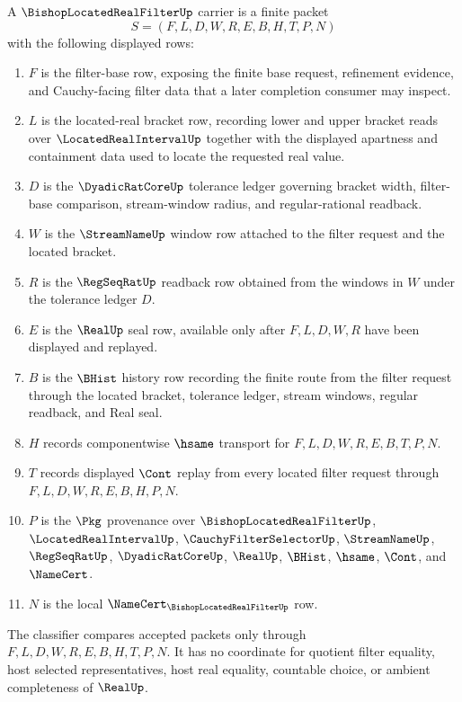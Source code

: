 \begin{definition}
\label{def:bishop-located-real-filter-carrier}
A $\BishopLocatedRealFilterUp$ carrier is a finite packet
$$
S=(F,L,D,W,R,E,B,H,T,P,N)
$$
with the following displayed rows:
\begin{enumerate}
\item $F$ is the filter-base row, exposing the finite base request, refinement evidence, and Cauchy-facing filter data that a later completion consumer may inspect.
\item $L$ is the located-real bracket row, recording lower and upper bracket reads over $\LocatedRealIntervalUp$ together with the displayed apartness and containment data used to locate the requested real value.
\item $D$ is the $\DyadicRatCoreUp$ tolerance ledger governing bracket width, filter-base comparison, stream-window radius, and regular-rational readback.
\item $W$ is the $\StreamNameUp$ window row attached to the filter request and the located bracket.
\item $R$ is the $\RegSeqRatUp$ readback row obtained from the windows in $W$ under the tolerance ledger $D$.
\item $E$ is the $\RealUp$ seal row, available only after $F,L,D,W,R$ have been displayed and replayed.
\item $B$ is the $\BHist$ history row recording the finite route from the filter request through the located bracket, tolerance ledger, stream windows, regular readback, and Real seal.
\item $H$ records componentwise $\hsame$ transport for $F,L,D,W,R,E,B,T,P,N$.
\item $T$ records displayed $\Cont$ replay from every located filter request through $F,L,D,W,R,E,B,H,P,N$.
\item $P$ is the $\Pkg$ provenance over $\BishopLocatedRealFilterUp$, $\LocatedRealIntervalUp$, $\CauchyFilterSelectorUp$, $\StreamNameUp$, $\RegSeqRatUp$, $\DyadicRatCoreUp$, $\RealUp$, $\BHist$, $\hsame$, $\Cont$, and $\NameCert$.
\item $N$ is the local $\NameCert_{\BishopLocatedRealFilterUp}$ row.
\end{enumerate}
The classifier compares accepted packets only through $F,L,D,W,R,E,B,H,T,P,N$. It has no coordinate for quotient filter equality, host selected representatives, host real equality, countable choice, or ambient completeness of $\RealUp$.
\end{definition}

